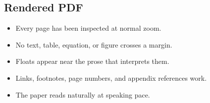 \subsection{Rendered PDF}

\begin{itemize}[leftmargin=*,label=\(\square\)]
    \item Every page has been inspected at normal zoom.
    \item No text, table, equation, or figure crosses a margin.
    \item Floats appear near the prose that interprets them.
    \item Links, footnotes, page numbers, and appendix references work.
    \item The paper reads naturally at speaking pace.
\end{itemize}
